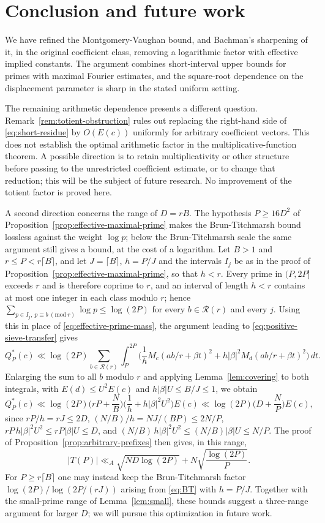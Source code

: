 \documentclass[11pt]{amsart}
\numberwithin{equation}{section}
\numberwithin{figure}{section}
\theoremstyle{definition}
\begin{document}
\section{Conclusion and future work}\label{sec:conclusion}

We have refined the Montgomery-Vaughan bound, and Bachman's sharpening
of it, in the original coefficient class, removing a logarithmic
factor with effective implied constants. The argument combines short-interval
upper bounds for primes with maximal Fourier estimates, and the
square-root dependence on the displacement parameter is sharp in the
stated uniform setting.

The remaining arithmetic dependence presents a different question.
Remark~\ref{rem:totient-obstruction} rules out replacing the
right-hand side of \eqref{eq:short-residue} by $O(E(c))$ uniformly
for arbitrary coefficient vectors. This does not establish the
optimal arithmetic factor in the multiplicative-function theorem.
A possible direction is to retain multiplicativity or other
structure before passing to the unrestricted coefficient estimate,
or to change that reduction; this will be the subject of future
research. No improvement of the totient factor is proved here.

A second direction concerns the range of $D=rB$. The hypothesis
$P\ge16D^2$ of Proposition~\ref{prop:effective-maximal-prime} makes
the Brun-Titchmarsh bound lossless against the weight $\log p$; below
the Brun-Titchmarsh scale the same argument still gives a bound, at
the cost of a logarithm. Let $B>1$ and $r\le P<r\lceil B\rceil$, and
let $J=\lceil B\rceil$, $h=P/J$ and the intervals $I_j$ be as in the
proof of Proposition~\ref{prop:effective-maximal-prime}, so that
$h<r$. Every prime in $(P,2P]$ exceeds $r$ and is therefore coprime
to $r$, and an interval of length $h<r$ contains at most one integer
in each class modulo $r$; hence
$\sum_{p\in I_j,\ p\equiv b\ (\mathrm{mod}\ r)}\log p\le\log(2P)$ for
every $b\in\mathcal R(r)$ and every $j$. Using this in place of
\eqref{eq:effective-prime-mass}, the argument leading to
\eqref{eq:positive-sieve-transfer} gives
\[
 Q_P^*(c)\ll\log(2P)\sum_{b\in\mathcal R(r)}\int_P^{2P}
 \Big(\frac1hM_c(ab/r+\beta t)^2+h|\beta|^2M_d(ab/r+\beta t)^2\Big)\,dt.
\]
Enlarging the sum to all $b$ modulo $r$ and applying
Lemma~\ref{lem:covering} to both integrals, with $E(d)\le U^2E(c)$ and
$h|\beta|U\le B/J\le1$, we obtain
\[
 Q_P^*(c)\ll\log(2P)\Big(rP+\frac NB\Big)\Big(\frac1h+h|\beta|^2U^2\Big)E(c)
 \ll\log(2P)\Big(D+\frac NP\Big)E(c),
\]
since $rP/h=rJ\le2D$, $(N/B)/h=NJ/(BP)\le2N/P$,
$rP\,h|\beta|^2U^2\le rP|\beta|U\le D$, and
$(N/B)\,h|\beta|^2U^2\le(N/B)|\beta|U\le N/P$. The proof of
Proposition~\ref{prop:arbitrary-prefixes} then gives, in this range,
\[
 |T(P)|\ll_A\sqrt{ND\log(2P)}+N\sqrt{\frac{\log(2P)}P}.
\]
For $P\ge r\lceil B\rceil$ one may instead keep the Brun-Titchmarsh
factor $\log(2P)/\log(2P/(rJ))$ arising from \eqref{eq:BT} with
$h=P/J$. Together with the small-prime range of Lemma~\ref{lem:small},
these bounds suggest a three-range argument for larger $D$; we will
pursue this optimization in future work.
\end{document}
